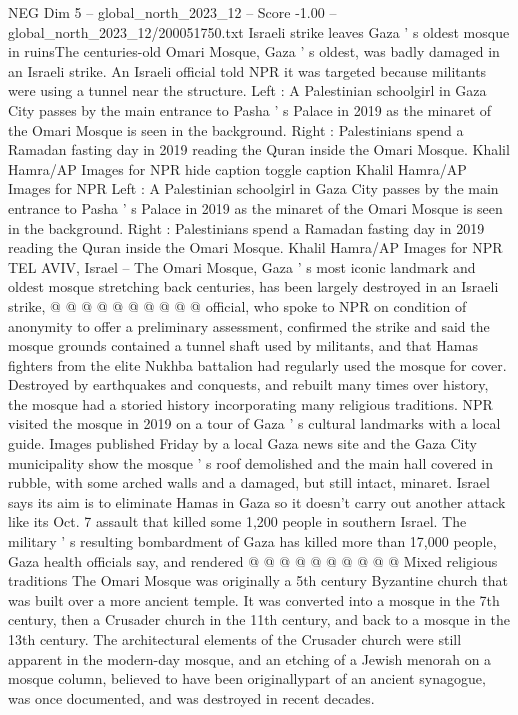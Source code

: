 \begin{textsample}{NEG Dim 5 – global\_north\_2023\_12 – Score -1.00 – global\_north\_2023\_12/200051750.txt}  \label{ex:f5_neg_054}
Israeli strike leaves Gaza ' s oldest mosque in ruinsThe centuries-old Omari Mosque, Gaza ' s oldest, was badly damaged in an Israeli strike.
An Israeli official told NPR it was targeted because militants were using a tunnel near the structure.
Left : A Palestinian schoolgirl in Gaza City passes by the main entrance to Pasha ' s Palace in 2019 as the minaret of the Omari Mosque is seen in the background.
Right : Palestinians spend a Ramadan fasting day in 2019 reading the Quran inside the Omari Mosque.
Khalil Hamra/AP Images for NPR hide caption toggle caption Khalil Hamra/AP Images for NPR Left : A Palestinian schoolgirl in Gaza City passes by the main entrance to Pasha ' s Palace in 2019 as the minaret of the Omari Mosque is seen in the background.
Right : Palestinians spend a Ramadan fasting day in 2019 reading the Quran inside the Omari Mosque.
Khalil Hamra/AP Images for NPR TEL AVIV, Israel -- The Omari Mosque, Gaza ' s most iconic landmark and oldest mosque stretching back centuries, has been largely destroyed in an Israeli strike, @ @ @ @ @ @ @ @ @ @ official, who spoke to NPR on condition of anonymity to offer a preliminary assessment, confirmed the strike and said the mosque grounds contained a tunnel shaft used by militants, and that Hamas fighters from the elite Nukhba battalion had regularly used the mosque for cover.
Destroyed by earthquakes and conquests, and rebuilt many times over history, the mosque had a storied history incorporating many religious traditions.
NPR visited the mosque in 2019 on a tour of Gaza ' s cultural landmarks with a local guide.
Images published Friday by a local Gaza news site and the Gaza City municipality show the mosque ' s roof demolished and the main hall covered in rubble, with some arched walls and a damaged, but still intact, minaret.
Israel says its aim is to eliminate Hamas in Gaza so it doesn't carry out another attack like its Oct. 7 assault that killed some 1,200 people in southern Israel.
The military ' s resulting bombardment of Gaza has killed more than 17,000 people, Gaza health officials say, and rendered @ @ @ @ @ @ @ @ @ @ Mixed religious traditions The Omari Mosque was originally a 5th century Byzantine church that was built over a more ancient temple.
It was converted into a mosque in the 7th century, then a Crusader church in the 11th century, and back to a mosque in the 13th century.
The architectural elements of the Crusader church were still apparent in the modern-day mosque, and an etching of a Jewish menorah on a mosque column, believed to have been originallypart of an ancient synagogue, was once documented, and was destroyed in recent decades.

\end{textsample}
